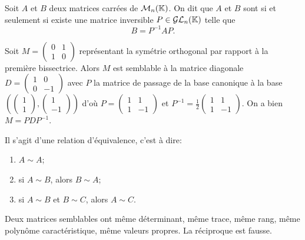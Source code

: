 \documentclass{book}
\begin{document}
\begin{Definition}[Similitude]
Soit $A$ et $B$ deux matrices carrées de $\mathcal{M}_{n}(\mathbb{K})$.
On dit que $A$ et $B$ sont  si et seulement si existe une matrice inversible $P\in  \mathcal{GL}_n(\mathbb{K})$
telle que \[ B = P^{-1} A P. \]
\end{Definition}
\begin{Exemple}  Soit $M=\begin{pmatrix}0&1\\1&0\end{pmatrix}$ représentant la symétrie orthogonal par rapport à la première bissectrice. Alors $M$ est semblable à la matrice diagonale $D=\begin{pmatrix}1&0\\0&-1\end{pmatrix}$ avec $P$ la matrice de passage de la base canonique à la base $(\begin{pmatrix}1\\1\end{pmatrix},\begin{pmatrix}1\\-1\end{pmatrix})$ d'où $P=\begin{pmatrix}1&1\\1&-1\end{pmatrix}$ et $P^{-1}=\frac 1 2\begin{pmatrix}1&1\\1&-1\end{pmatrix}$. On a bien $M=PDP^{-1}$.
\end{Exemple}
\begin{Proposition}[Propriétés]
Il s'agit d'une relation d'équivalence, c'est à dire:
\begin{enumerate}
\item $A \sim A$;
\item si $A \sim B$, alors $B \sim A$;
\item si $A \sim B$ et $B \sim C$, alors $A \sim C$.
\end{enumerate}
\end{Proposition}
\begin{Remarque}
Deux matrices semblables ont même déterminant, même trace, même rang, même
polynôme caractéristique, même valeurs propres. La réciproque est fausse.

\end{Remarque}
\end{document}

